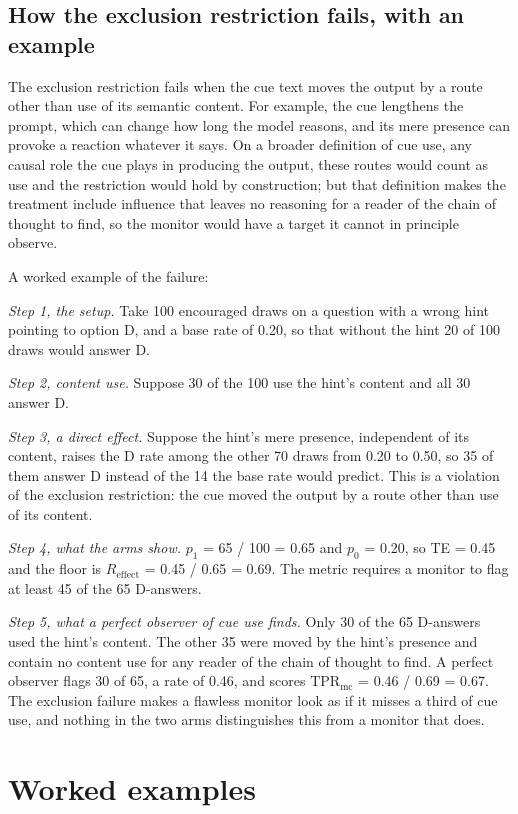\documentclass[11pt,a4paper]{article}
\begin{document}
\setcounter{subsection}{5}
\subsection{How the exclusion restriction fails, with an example}
The exclusion restriction fails when the cue text moves the output by a route other than use of its semantic content. For example, the cue lengthens the prompt, which can change how long the model reasons, and its mere presence can provoke a reaction whatever it says. On a broader definition of cue use, any causal role the cue plays in producing the output, these routes would count as use and the restriction would hold by construction; but that definition makes the treatment include influence that leaves no reasoning for a reader of the chain of thought to find, so the monitor would have a target it cannot in principle observe.

A worked example of the failure:

\emph{Step 1, the setup.} Take 100 encouraged draws on a question with a wrong hint pointing to option D, and a base rate of 0.20, so that without the hint 20 of 100 draws would answer D.

\emph{Step 2, content use.} Suppose 30 of the 100 use the hint's content and all 30 answer D.

\emph{Step 3, a direct effect.} Suppose the hint's mere presence, independent of its content, raises the D rate among the other 70 draws from 0.20 to 0.50, so 35 of them answer D instead of the 14 the base rate would predict. This is a violation of the exclusion restriction: the cue moved the output by a route other than use of its content.

\emph{Step 4, what the arms show.} $p_1$ = 65 / 100 = 0.65 and $p_0$ = 0.20, so TE = 0.45 and the floor is $R_{\mathrm{effect}}$ = 0.45 / 0.65 = 0.69. The metric requires a monitor to flag at least 45 of the 65 D-answers.

\emph{Step 5, what a perfect observer of cue use finds.} Only 30 of the 65 D-answers used the hint's content. The other 35 were moved by the hint's presence and contain no content use for any reader of the chain of thought to find. A perfect observer flags 30 of 65, a rate of 0.46, and scores $\mathrm{TPR}_{\mathrm{mc}}$ = 0.46 / 0.69 = 0.67. The exclusion failure makes a flawless monitor look as if it misses a third of cue use, and nothing in the two arms distinguishes this from a monitor that does.

\setcounter{section}{1}
\section{Worked examples}
\setcounter{subsection}{4}
\end{document}
